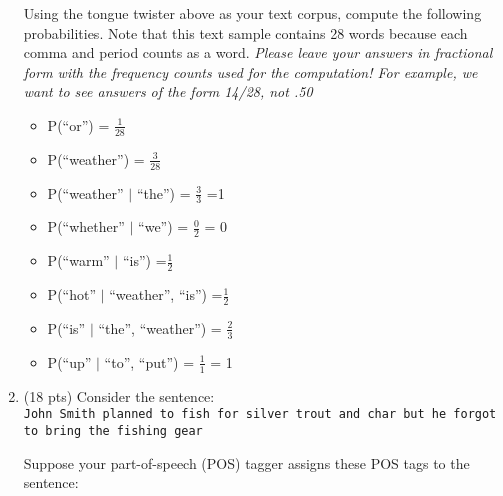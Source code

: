 \documentclass[11pt]{article}
\begin{document}
\begin{enumerate}
Using the tongue twister above as your text corpus, compute the
following probabilities. Note that this text sample contains 28 words
because each comma  and period counts as a word. {\it Please leave
  your answers in fractional form with 
  the frequency counts used for the computation! For   example, we
  want to see answers of the form 14/28, not .50}  

\begin{itemize}

\item P(``or'')  = $\frac{1}{28}$\\

\item P(``weather'') = $\frac{3}{28}$\ \\

\item P(``weather'' $\mid$ ``the'') = $\frac{3}{3}$ =1\ \\

\item P(``whether'' $\mid$ ``we'')  = $\frac{0}{2}$ = 0\\

\item P(``warm'' $\mid$ ``is'') =$\frac{1}{2}$ \\

\item P(``hot'' $\mid$ ``weather'', ``is'') =$\frac{1}{2}$  \\

\item P(``is'' $\mid$ ``the'', ``weather'') = $\frac{2}{3}$  \\

\item P(``up'' $\mid$ ``to'', ``put'') = $\frac{1}{1}$ = 1 \\


\end{itemize}




\item (18 pts) Consider the sentence:  \\
{\tt John Smith planned to fish for silver trout and char but he forgot to bring the fishing gear}

Suppose your part-of-speech (POS) tagger assigns these POS tags to the sentence:


\end{enumerate}
\end{document}
